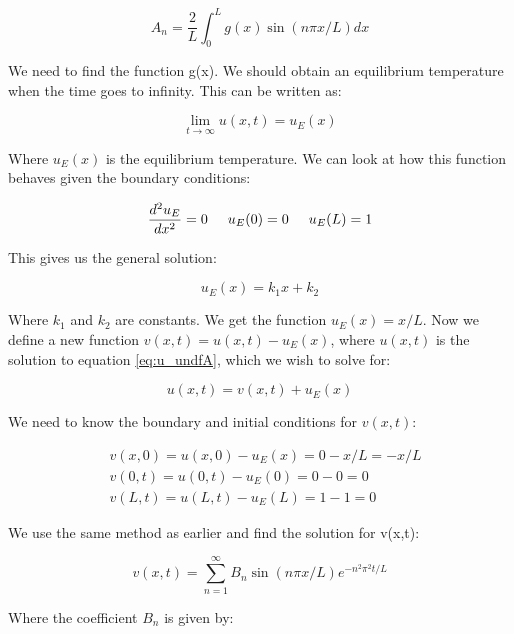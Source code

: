 \documentclass{article}
\begin{document}
\begin{equation*}
A_n=\frac{2}{L}\int_0^Lg(x)\sin{(n\pi x/L)} dx
\end{equation*}

We need to find the function g(x). We should obtain an equilibrium temperature when the time goes to infinity. This can be written as:

\begin{equation*}
\lim_{t \to \infty} u(x,t) = u_E(x)
\end{equation*}

Where $u_E(x)$ is the equilibrium temperature. We can look at how this function behaves given the boundary conditions:

\begin{equation*}
\frac{d^2 u_E}{dx^2}=0 \hspace{0.5cm} u_E(0)=0\hspace{0.5cm} u_E(L)=1
\end{equation*}

This gives us the general solution:

\begin{equation*}
u_E(x)=k_1x + k_2
\end{equation*}

Where $k_1$ and $k_2$ are constants. We get the function $u_E(x)=x/L$. Now we define a new function $v(x,t)=u(x,t)-u_E(x)$, where $u(x,t)$ is the solution to equation \ref{eq:u_undfA}, which we wish to solve for:

\begin{equation}
u(x,t)=v(x,t)+u_E(x)
\label{eq:vu}
\end{equation}

We need to know the boundary and initial conditions for $v(x,t)$:

\begin{equation*}
\begin{split}
&v(x,0)=u(x,0)-u_E(x)=0-x/L=-x/L\\
&v(0,t)=u(0,t)-u_E(0)=0-0=0\\
&v(L,t)=u(L,t)-u_E(L)=1-1=0
\end{split}
\end{equation*}
 
 We use the same method as earlier and find the solution for v(x,t):
 
 \begin{equation}
v(x,t) = \sum_{n=1}^{\infty}B_n\sin{(n\pi x/L)}e^{-n^2\pi^2t/L}
\end{equation}
 
Where the coefficient $B_n$ is given by:
\end{document}
